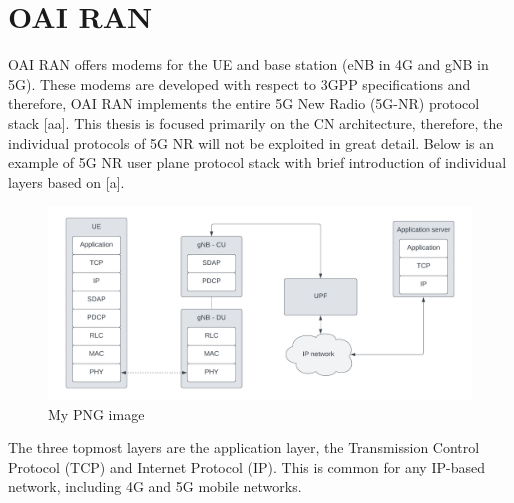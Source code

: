 \documentclass[12pt,a4paper,twoside]{report}
\begin{document}
\section{OAI RAN}
OAI RAN offers modems for the UE and base station (eNB in 4G and gNB in 5G). These modems are developed with respect to 3GPP specifications and therefore, OAI RAN implements the entire 5G New Radio (5G-NR) protocol stack [aa]. This thesis is focused primarily on the CN architecture, therefore, the individual protocols of 5G NR will not be exploited in great detail. Below is an example of 5G NR user plane protocol stack with brief introduction of individual layers based on [a].

\begin{figure}[ht]
	\centering
	\includegraphics[width=13cm]{./images/5G-NR-protstack.png} 
	\caption{My PNG image}
\end{figure}
The three topmost layers are the application layer, the Transmission Control Protocol (TCP) and Internet Protocol (IP). This is common for any IP-based network, including 4G and 5G mobile networks.
\end{document}
